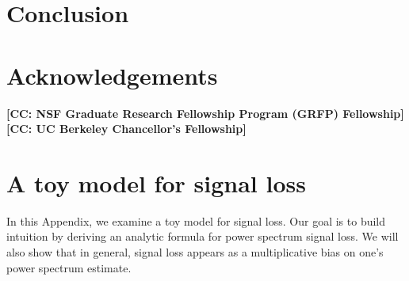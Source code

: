 \documentclass[preprint2,numberedappendix,tighten]{aastex6}  %
\newcommand{\cc}[1]{{\color{purple} \textbf{[CC: #1]}}}
\begin{document}
\section{Conclusion}
\label{sec:Con}

\section{Acknowledgements}
\cc{NSF Graduate Research Fellowship Program (GRFP) Fellowship}
\cc{UC Berkeley Chancellor's Fellowship}
\label{sec:Ack}

\appendix
\section{A toy model for signal loss}
\label{sec:sigloss_appendix}

In this Appendix, we examine a toy model for signal loss. Our goal is to build intuition by deriving an analytic formula for power spectrum signal loss. We will also show that in general, signal loss appears as a multiplicative bias on one's power spectrum estimate.
\end{document}
